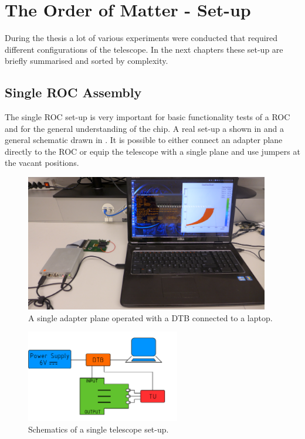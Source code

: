 \documentclass[british,11pt,a4paper]{memoir}
\begin{document}
\chapter{The Order of Matter - Set-up}
During the thesis a lot of various experiments were conducted that required different configurations of the telescope. In the next chapters these set-up are briefly summarised and sorted by complexity. 
\section{Single \ac{ROC} Assembly}
The single \ac{ROC} set-up  is very important for basic functionality tests of a \ac{ROC} and for the general understanding of the chip. A real set-up a shown in  and a general schematic drawn in . It is possible to either connect an adapter plane directly to the \ac{ROC} or equip the telescope with a single plane and use jumpers at the vacant positions.
\begin{figure}[ht]
	\centering
	\includegraphics[width=0.95\textwidth]{setup/singlesetup}
	\caption{A single adapter plane operated with a \ac{DTB} connected to a laptop.}
	\label{psingleroc}
\end{figure}\no
\begin{figure}[ht]
	\centering
	\includegraphics[width=0.6\textwidth]{singletel}
	\caption{Schematics of a single telescope set-up.}
	\label{psinglerocdraw}
\end{figure}\no
\end{document}
